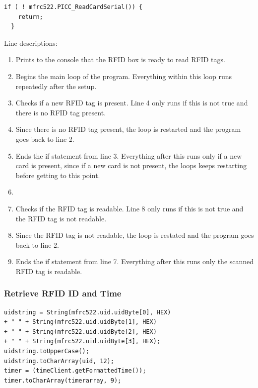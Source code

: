 \documentclass[12pt]{article}
\begin{document}
\begin{spacing}{1.2}
\begin{lstlisting}[language=Arduino]
  if ( ! mfrc522.PICC_ReadCardSerial()) {
    return;
  }
\end{lstlisting}

Line descriptions:
\begin{enumerate}
	\item Prints to the console that the RFID box is ready to read RFID tags.
	\item Begins the main loop of the program. Everything within this loop runs repeatedly after the setup.
	\item Checks if a new RFID tag is present. Line 4 only runs if this is not true and there is no RFID tag present.
	\item Since there is no RFID tag present, the loop is restarted and the program goes back to line 2.
	\item Ends the if statement from line 3. Everything after this runs only if a new card is present, since if a new card is not present, the loops keeps restarting before getting to this point.
	\item
	\item Checks if the RFID tag is readable. Line 8 only runs if this is not true and the RFID tag is not readable.
	\item Since the RFID tag is not readable, the loop is restated and the program goes back to line 2.
	\item Ends the if statement from line 7. Everything after this runs only the scanned RFID tag is readable. 
\end{enumerate}

\subsubsection{Retrieve RFID ID and Time}

\begin{lstlisting}[language=Arduino]  
uidstring = String(mfrc522.uid.uidByte[0], HEX)
+ " " + String(mfrc522.uid.uidByte[1], HEX)
+ " " + String(mfrc522.uid.uidByte[2], HEX)
+ " " + String(mfrc522.uid.uidByte[3], HEX);
uidstring.toUpperCase();
uidstring.toCharArray(uid, 12);
timer = (timeClient.getFormattedTime());
timer.toCharArray(timerarray, 9);
\end{lstlisting}


\end{spacing}
\end{document}
